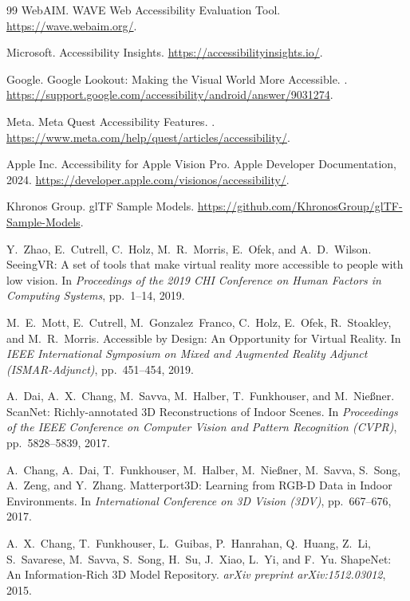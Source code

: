 \documentclass[11pt,letterpaper]{article}
\begin{document}
\begin{thebibliography}{99}
WebAIM.
\newblock WAVE Web Accessibility Evaluation Tool.
\newblock \url{https://wave.webaim.org/}.

Microsoft.
\newblock Accessibility Insights.
\newblock \url{https://accessibilityinsights.io/}.

Google.
\newblock Google Lookout: Making the Visual World More Accessible.
. \url{https://support.google.com/accessibility/android/answer/9031274}.

Meta.
\newblock Meta Quest Accessibility Features.
. \url{https://www.meta.com/help/quest/articles/accessibility/}.

Apple Inc.
\newblock Accessibility for Apple Vision Pro.
\newblock Apple Developer Documentation, 2024. \url{https://developer.apple.com/visionos/accessibility/}.

Khronos Group.
\newblock glTF Sample Models.
\newblock \url{https://github.com/KhronosGroup/glTF-Sample-Models}.

Y.~Zhao, E.~Cutrell, C.~Holz, M.~R.~Morris, E.~Ofek, and A.~D.~Wilson.
\newblock SeeingVR: A set of tools that make virtual reality more accessible to people with low vision.
\newblock In \emph{Proceedings of the 2019 CHI Conference on Human Factors in Computing Systems}, pp.~1--14, 2019.

M.~E.~Mott, E.~Cutrell, M.~Gonzalez~Franco, C.~Holz, E.~Ofek, R.~Stoakley, and M.~R.~Morris.
\newblock Accessible by Design: An Opportunity for Virtual Reality.
\newblock In \emph{IEEE International Symposium on Mixed and Augmented Reality Adjunct (ISMAR-Adjunct)}, pp.~451--454, 2019.

A.~Dai, A.~X.~Chang, M.~Savva, M.~Halber, T.~Funkhouser, and M.~Nie{\ss}ner.
\newblock ScanNet: Richly-annotated 3D Reconstructions of Indoor Scenes.
\newblock In \emph{Proceedings of the IEEE Conference on Computer Vision and Pattern Recognition (CVPR)}, pp.~5828--5839, 2017.

A.~Chang, A.~Dai, T.~Funkhouser, M.~Halber, M.~Nie{\ss}ner, M.~Savva, S.~Song, A.~Zeng, and Y.~Zhang.
\newblock Matterport3D: Learning from RGB-D Data in Indoor Environments.
\newblock In \emph{International Conference on 3D Vision (3DV)}, pp.~667--676, 2017.

A.~X.~Chang, T.~Funkhouser, L.~Guibas, P.~Hanrahan, Q.~Huang, Z.~Li, S.~Savarese, M.~Savva, S.~Song, H.~Su, J.~Xiao, L.~Yi, and F.~Yu.
\newblock ShapeNet: An Information-Rich 3D Model Repository.
\newblock \emph{arXiv preprint arXiv:1512.03012}, 2015.


\end{thebibliography}
\end{document}
